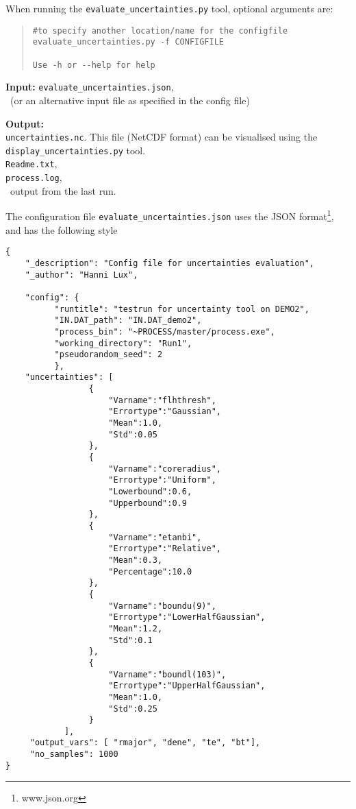 When running the \texttt{evaluate\_uncertainties.py} tool, optional arguments are:
\begin{quote}
\begin{verbatim}
#to specify another location/name for the configfile
evaluate_uncertainties.py -f CONFIGFILE

Use -h or --help for help
\end{verbatim}
\end{quote}



\begin{description}
\item{\textbf{Input:}} \texttt{evaluate\_uncertainties.json},\\
\indat\ (or an alternative input file as specified in the config file)

\item{\textbf{Output:}} \\
\texttt{uncertainties.nc}. This file (NetCDF format) can be visualised using the \texttt{display\_uncertainties.py} tool. \\
\texttt{Readme.txt},\\
\texttt{process.log}, \\
\process\ output from the last run.

\end{description}
The configuration file \texttt{evaluate\_uncertainties.json} uses the JSON
format\footnote{www.json.org}, and has the following style
\begin{framed}
\begin{verbatim}
{
	"_description": "Config file for uncertainties evaluation",
	"_author": "Hanni Lux",

	"config": {
		  "runtitle": "testrun for uncertainty tool on DEMO2",
		  "IN.DAT_path": "IN.DAT_demo2",
		  "process_bin": "~PROCESS/master/process.exe",
		  "working_directory": "Run1",
		  "pseudorandom_seed": 2
		  },
	"uncertainties": [
          	     {
               	     "Varname":"flhthresh",
               	     "Errortype":"Gaussian",
               	     "Mean":1.0,
               	     "Std":0.05
          	     },
          	     {
               	     "Varname":"coreradius",
               	     "Errortype":"Uniform",
               	     "Lowerbound":0.6,
               	     "Upperbound":0.9
          	     },
          	     {
               	     "Varname":"etanbi",
               	     "Errortype":"Relative",
               	     "Mean":0.3,
               	     "Percentage":10.0
          	     },
          	     {
               	     "Varname":"boundu(9)",
               	     "Errortype":"LowerHalfGaussian",
               	     "Mean":1.2,
               	     "Std":0.1
          	     },
          	     {
               	     "Varname":"boundl(103)",
               	     "Errortype":"UpperHalfGaussian",
               	     "Mean":1.0,
               	     "Std":0.25
          	     }
	     	],
     "output_vars": [ "rmajor", "dene", "te", "bt"],
     "no_samples": 1000
}
\end{verbatim}
\end{framed}
